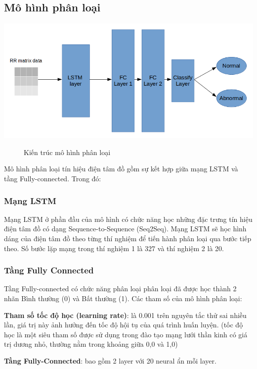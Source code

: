 \subsection{Mô hình phân loại}
\begin{center}
    \includegraphics[scale=.4]{image/chapter5/model_architechture.png}
    \begin{figure}[htp]
    \begin{center}
    \end{center}
    \caption{Kiến trúc mô hình phân loại}
    \end{figure}
\end{center}
Mô hình phân loại tín hiệu điện tâm đồ gồm sự kết hợp giữa mạng LSTM và tầng Fully-connected. Trong đó:
\subsubsection{Mạng LSTM}
Mạng LSTM ở phần đầu của mô hình có chức năng học những đặc trưng tín hiệu điện tâm đồ có dạng Sequence-to-Sequence (Seq2Seq). Mạng LSTM sẽ học hình dáng của điện tâm đồ theo từng thí nghiệm để tiến hành phân loại qua bước tiếp theo. Số bước lặp mạng trong thí nghiệm 1 là 327 và thí nghiệm 2 là 20.
\subsubsection{Tầng Fully Connected}
Tầng Fully-connected có chức năng phân loại phân loại đã được học thành 2 nhãn Bình thường (0) và Bất thường (1).
Các tham số của mô hình phân loại:

\textbf{Tham số tốc độ học (learning rate)}: là 0.001 trên nguyên tắc thử sai nhiều lần, giá trị này ảnh hưởng đến tốc độ hội tụ của quá trình huấn luyện. (tốc độ học là một siêu tham số  được sử dụng trong đào tạo mạng lưới thần kinh có giá trị dương nhỏ, thường nằm trong khoảng giữa 0,0 và 1,0)

\textbf{Tầng Fully-Connected}: bao gồm 2 layer với 20 neural ẩn mỗi layer.

